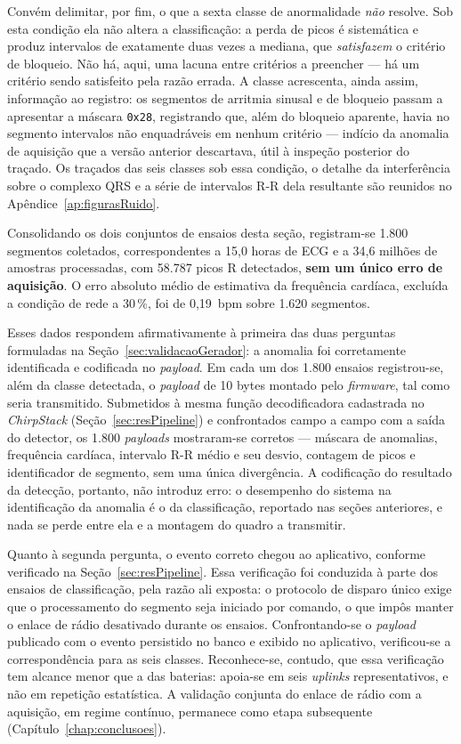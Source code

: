 Convém delimitar, por fim, o que a sexta classe de anormalidade \emph{não} resolve. Sob esta
condição ela não altera a classificação: a perda de picos é sistemática e produz intervalos
de exatamente duas vezes a mediana, que \emph{satisfazem} o critério de bloqueio. Não há, aqui,
uma lacuna entre critérios a preencher --- há um critério sendo satisfeito pela razão errada.
A classe acrescenta, ainda assim, informação ao registro: os segmentos de arritmia sinusal e
de bloqueio passam a apresentar a máscara \texttt{0x28}, registrando que, além do bloqueio
aparente, havia no segmento intervalos não enquadráveis em nenhum critério --- indício da
anomalia de aquisição que a versão anterior descartava, útil à inspeção posterior do traçado.
Os traçados das seis classes sob essa condição, o detalhe da interferência sobre o complexo
QRS e a série de intervalos R-R dela resultante são reunidos no
Apêndice~\ref{ap:figurasRuido}.

Consolidando os dois conjuntos de ensaios desta seção, registram-se 1.800 segmentos coletados, correspondentes a 15,0 horas de \acs{ECG} e a 34,6 milhões de amostras processadas, com 58.787 picos R detectados, \textbf{sem um único erro de aquisição}. O erro absoluto médio de estimativa da frequência cardíaca, excluída a condição de rede a 30\,\%, foi de 0,19~bpm sobre 1.620 segmentos.

Esses dados respondem afirmativamente à primeira das duas perguntas formuladas na Seção~\ref{sec:validacaoGerador}: a anomalia foi corretamente identificada e codificada no \textit{payload}. Em cada um dos 1.800 ensaios registrou-se, além da classe detectada, o \textit{payload} de 10 bytes montado pelo \textit{firmware}, tal como seria transmitido. Submetidos à mesma função decodificadora cadastrada no \textit{ChirpStack} (Seção~\ref{sec:resPipeline}) e confrontados campo a campo com a saída do detector, os 1.800 \textit{payloads} mostraram-se corretos --- máscara de anomalias, frequência cardíaca, intervalo R-R médio e seu desvio, contagem de picos e identificador de segmento, sem uma única divergência. A codificação do resultado da detecção, portanto, não introduz erro: o desempenho do sistema na identificação da anomalia é o da classificação, reportado nas seções anteriores, e nada se perde entre ela e a montagem do quadro a transmitir.

Quanto à segunda pergunta, o evento correto chegou ao aplicativo, conforme verificado na Seção~\ref{sec:resPipeline}. Essa verificação foi conduzida à parte dos ensaios de classificação, pela razão ali exposta: o protocolo de disparo único exige que o processamento do segmento seja iniciado por comando, o que impôs manter o enlace de rádio desativado durante os ensaios. Confrontando-se o \textit{payload} publicado com o evento persistido no banco e exibido no aplicativo, verificou-se a correspondência para as seis classes. Reconhece-se, contudo, que essa verificação tem alcance menor que a das baterias: apoia-se em seis \textit{uplinks} representativos, e não em repetição estatística. A validação conjunta do enlace de rádio com a aquisição, em regime contínuo, permanece como etapa subsequente (Capítulo~\ref{chap:conclusoes}).

